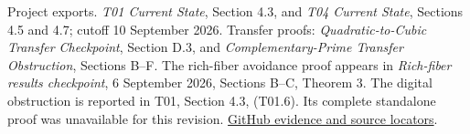 Project exports. \emph{T01 Current State}, Section 4.3, and \emph{T04 Current State}, Sections 4.5 and 4.7; cutoff 10 September 2026. Transfer proofs: \emph{Quadratic-to-Cubic Transfer Checkpoint}, Section D.3, and \emph{Complementary-Prime Transfer Obstruction}, Sections B--F. The rich-fiber avoidance proof appears in \emph{Rich-fiber results checkpoint}, 6 September 2026, Sections B--C, Theorem 3. The digital obstruction is reported in T01, Section 4.3, (T01.6). Its complete standalone proof was unavailable for this revision. \href{https://github.com/hnt119/polynomial-image-compression/blob/bd1f2d663262821575eebdfa559b7c25f76b46ab/research/exports/2026-11-05-report-references/README.md#ref17}{GitHub evidence and source locators}.
